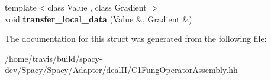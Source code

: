 \begin{DoxyCompactItemize}
\item 
\hypertarget{structSpacy_1_1dealII_1_1Detail_1_1OperatorUpdate_3_01dim_00_01VariableDims_00_01row_00-1_01_4_afbbe2d5ddfab5df42ddfa42639ee0f9e}{{\footnotesize template$<$class Value , class Gradient $>$ }\\void {\bfseries transfer\-\_\-local\-\_\-data} (Value \&, Gradient \&)}\label{structSpacy_1_1dealII_1_1Detail_1_1OperatorUpdate_3_01dim_00_01VariableDims_00_01row_00-1_01_4_afbbe2d5ddfab5df42ddfa42639ee0f9e}

\end{DoxyCompactItemize}


The documentation for this struct was generated from the following file\-:\begin{DoxyCompactItemize}
\item 
/home/travis/build/spacy-\/dev/\-Spacy/\-Spacy/\-Adapter/deal\-I\-I/C1\-Fung\-Operator\-Assembly.\-hh\end{DoxyCompactItemize}
